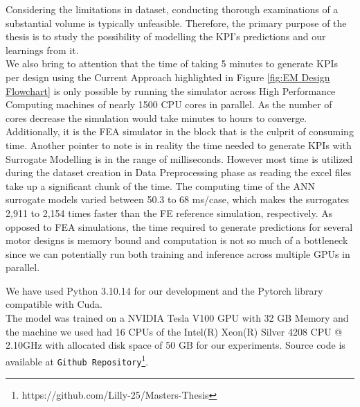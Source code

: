\documentclass{report} %
\begin{document}
Considering the limitations in dataset, conducting thorough examinations of a substantial volume is typically unfeasible. 
Therefore, the primary purpose of the thesis is to study the possibility of modelling the \ac{KPI}'s predictions and our learnings from it.\\

We also bring to attention that the time of taking 5 minutes to generate \ac{KPI}s per design using the Current Approach highlighted in Figure \ref{fig:EM Design Flowchart} is only possible by running the simulator across 
High Performance Computing machines of nearly 1500 CPU cores in parallel. As the number of cores decrease the simulation would take minutes to hours to converge.
Additionally, it is the \ac{FEA} simulator in the block that is the culprit of consuming time.
Another pointer to note is in reality the time needed to generate \ac{KPI}s with Surrogate Modelling is in the range of milliseconds. 
However most time is utilized during the dataset creation in Data Preprocessing phase as reading the excel files take up a significant chunk of the time.
The computing time of the ANN surrogate models varied between 50.3 to 68 ms/case, which makes the surrogates 2,911 to 2,154 times faster than the FE reference simulation, respectively.
As opposed to \ac{FEA} simulations, the time required to generate predictions for several motor designs is memory bound 
and computation is not so much of a bottleneck since we can potentially run both training and inference across multiple GPUs in parallel.

We have used Python 3.10.14 for our development and the Pytorch library compatible with Cuda.\\
The model was trained on a NVIDIA Tesla V100 \ac{GPU} with 32 GB Memory and the machine we used had 16 CPUs of the Intel(R) Xeon(R) Silver 4208 CPU @ 2.10GHz with allocated disk space of 50 GB for our experiments.
Source code is available at \texttt{Github Repository}\footnote{https://github.com/Lilly-25/Masters-Thesis}.


\newpage 
\end{document}
